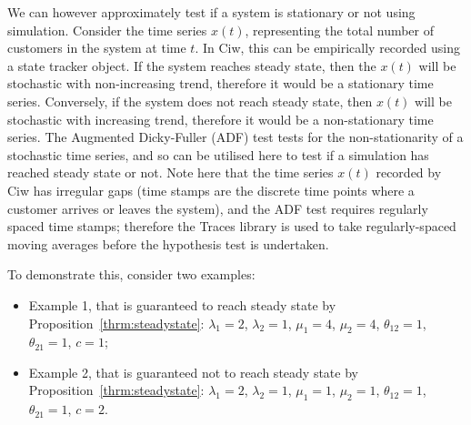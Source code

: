 \documentclass{article}
\begin{document}
We can however approximately test if a system is stationary or not using
simulation. Consider the time series $x(t)$, representing the total number of
customers in the system at time $t$. In Ciw, this can be empirically recorded
using a state tracker object. If the system reaches steady state, then the
$x(t)$ will be stochastic with non-increasing trend, therefore it would be a
stationary time series. Conversely, if the system does not reach steady state,
then $x(t)$ will be stochastic with increasing trend, therefore it would be a
non-stationary time series.
The Augmented Dicky-Fuller (ADF) test \cite{dickyfuller79} tests for the
non-stationarity of a stochastic time series, and so can be utilised here to
test if a simulation has reached steady state or not. Note here that the time
series $x(t)$ recorded by Ciw has irregular gaps (time stamps are the discrete
time points where a customer arrives or leaves the system), and the ADF test
requires regularly spaced time stamps; therefore the Traces library
\cite{traces} is used to take regularly-spaced moving averages before the
hypothesis test is undertaken.

To demonstrate this, consider two examples:

\begin{itemize}
  \item Example 1, that is guaranteed to reach steady state by
  Proposition~\ref{thrm:steadystate}: $\lambda_1 = 2$, $\lambda_2 = 1$,
  $\mu_1 = 4$, $\mu_2 = 4$, $\theta_{12} = 1$, $\theta_{21} = 1$, $c = 1$;
  \item Example 2, that is guaranteed not to reach steady state by
  Proposition~\ref{thrm:steadystate}: $\lambda_1 = 2$, $\lambda_2 = 1$,
  $\mu_1 = 1$, $\mu_2 = 1$, $\theta_{12} = 1$, $\theta_{21} = 1$, $c = 2$.
\end{itemize}
\end{document}
